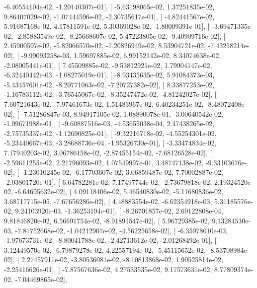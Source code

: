 \documentclass{article}
\begin{document}
         -6.40554104e-02,  -1.20140307e-01],
       [ -5.63198065e-02,   1.37251835e-02,   9.86407029e-02,
         -1.07444596e-02,  -2.30735617e-01],
       [ -4.82441567e-02,   5.91687168e-02,   4.17811591e-02,
          5.30369028e-02,  -1.80009391e-01],
       [ -3.69471335e-02,  -2.85883549e-02,  -8.25668607e-02,
          5.47223805e-02,  -9.40909716e-02],
       [  2.45900597e-02,  -5.82066570e-02,  -7.20826949e-02,
          8.53904721e-02,  -7.43218214e-02],
       [ -9.99093258e-03,   1.59697885e-02,   6.99152142e-02,
          8.34074638e-02,  -2.08005441e-01],
       [  7.45509885e-02,  -9.53812921e-02,   1.79904147e-02,
         -6.32440442e-03,  -1.08275019e-01],
       [ -8.93435635e-02,   5.91084373e-03,  -5.43457601e-02,
         -8.20771063e-02,  -7.20727382e-02],
       [  8.33877253e-02,  -1.16783112e-02,  -3.76545067e-02,
         -8.35247472e-02,  -4.81242027e-02],
       [  7.60721643e-02,  -7.97461673e-02,   1.51483967e-02,
          6.40234251e-02,  -8.48072408e-02],
       [ -7.51286847e-03,   8.94917105e-02,   1.08890078e-01,
         -3.00640542e-02,  -1.09671988e-01],
       [ -9.60887516e-03,  -4.53655038e-04,   2.47438265e-02,
         -2.75735337e-02,  -1.12690825e-01],
       [ -9.32216718e-02,  -4.55254301e-02,  -5.23440667e-03,
         -3.28688736e-04,  -1.95326730e-01],
       [ -3.33474834e-02,   7.17940203e-02,   3.06786158e-02,
         -2.87455154e-02,  -7.68126528e-02],
       [ -2.59611255e-02,   2.21796093e-02,   1.07549997e-01,
          3.48747138e-02,  -9.33103676e-02],
       [ -1.23010245e-02,  -6.17703607e-02,   3.06859487e-02,
          7.70002887e-02,  -2.03801720e-01],
       [  6.64782281e-02,   7.17497744e-02,  -2.73679818e-02,
          2.19324520e-02,  -6.64695632e-02],
       [  4.09118406e-02,   5.46540830e-02,  -5.11680836e-02,
          3.68717715e-05,  -7.67656286e-02],
       [  4.48883554e-02,  -6.62354918e-03,   5.31185576e-02,
          9.24103920e-03,  -1.36253194e-01],
       [ -8.26701857e-02,   2.69122808e-04,   9.81846820e-02,
          6.56691754e-02,  -8.91891547e-02],
       [  5.96729385e-02,   9.13284530e-03,  -7.81752668e-02,
         -1.04212907e-02,  -4.56225658e-02],
       [ -6.35978010e-03,  -1.97673731e-02,  -8.80041788e-02,
         -2.42713612e-02,  -2.01268492e-01],
       [  3.12449570e-02,  -6.79879278e-02,   4.22557194e-02,
         -5.45115652e-02,  -8.53708984e-02],
       [  2.27457911e-02,  -3.80536081e-02,  -8.10813868e-02,
          1.90525814e-02,  -2.25416626e-01],
       [ -7.87567636e-02,   4.27533535e-02,   9.17573631e-02,
          8.77809374e-02,  -7.04469865e-02],
\end{document}
